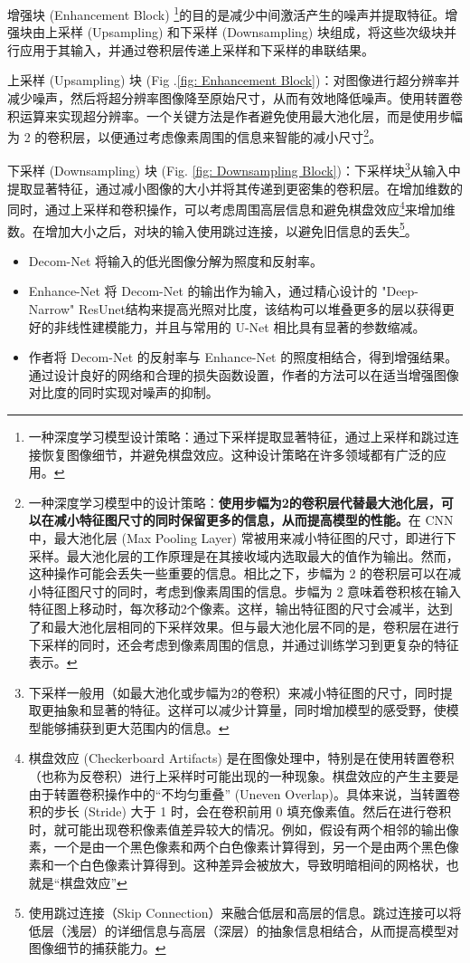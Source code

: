 \documentclass[letterpaper,10pt]{article}
\begin{document}
			增强块 (Enhancement Block) \footnote{一种深度学习模型设计策略：通过下采样提取显著特征，通过上采样和跳过连接恢复图像细节，并避免棋盘效应。这种设计策略在许多领域都有广泛的应用。}的目的是减少中间激活产生的噪声并提取特征。增强块由上采样 (Upsampling) 和下采样 (Downsampling) 块组成，将这些次级块并行应用于其输入，并通过卷积层传递上采样和下采样的串联结果。
			
			上采样 (Upsampling) 块 (Fig .\ref{fig: Enhancement Block})：对图像进行超分辨率并减少噪声，然后将超分辨率图像降至原始尺寸，从而有效地降低噪声。使用转置卷积运算来实现超分辨率。一个关键方法是作者避免使用最大池化层，而是使用步幅为 2 的卷积层，以便通过考虑像素周围的信息来智能的减小尺寸\footnote{一种深度学习模型中的设计策略：\textbf{使用步幅为2的卷积层代替最大池化层，可以在减小特征图尺寸的同时保留更多的信息，从而提高模型的性能。}在 CNN 中，最大池化层 (Max Pooling Layer) 常被用来减小特征图的尺寸，即进行下采样。最大池化层的工作原理是在其接收域内选取最大的值作为输出。然而，这种操作可能会丢失一些重要的信息。相比之下，步幅为 2 的卷积层可以在减小特征图尺寸的同时，考虑到像素周围的信息。步幅为 2 意味着卷积核在输入特征图上移动时，每次移动2个像素。这样，输出特征图的尺寸会减半，达到了和最大池化层相同的下采样效果。但与最大池化层不同的是，卷积层在进行下采样的同时，还会考虑到像素周围的信息，并通过训练学习到更复杂的特征表示。}。
			
			下采样 (Downsampling) 块 (Fig. \ref{fig: Downsampling Block})：下采样块\footnote{下采样一般用（如最大池化或步幅为2的卷积）来减小特征图的尺寸，同时提取更抽象和显著的特征。这样可以减少计算量，同时增加模型的感受野，使模型能够捕获到更大范围内的信息。}从输入中提取显著特征，通过减小图像的大小并将其传递到更密集的卷积层。在增加维数的同时，通过上采样和卷积操作，可以考虑周围高层信息和避免棋盘效应\footnote{棋盘效应 (Checkerboard Artifacts) 是在图像处理中，特别是在使用转置卷积（也称为反卷积）进行上采样时可能出现的一种现象。棋盘效应的产生主要是由于转置卷积操作中的“不均匀重叠” (Uneven Overlap)。具体来说，当转置卷积的步长 (Stride) 大于 1 时，会在卷积前用 0 填充像素值。然后在进行卷积时，就可能出现卷积像素值差异较大的情况。例如，假设有两个相邻的输出像素，一个是由一个黑色像素和两个白色像素计算得到，另一个是由两个黑色像素和一个白色像素计算得到。这种差异会被放大，导致明暗相间的网格状，也就是“棋盘效应”}来增加维数。在增加大小之后，对块的输入使用跳过连接，以避免旧信息的丢失\footnote{使用跳过连接（Skip Connection）来融合低层和高层的信息。跳过连接可以将低层（浅层）的详细信息与高层（深层）的抽象信息相结合，从而提高模型对图像细节的捕获能力。}。
			
			\begin{itemize}
				\item[(1)] 
				Decom-Net 将输入的低光图像分解为照度和反射率。
				
				\item[(2)]
				Enhance-Net 将 Decom-Net 的输出作为输入，通过精心设计的 "Deep-Narrow" ResUnet结构来提高光照对比度，该结构可以堆叠更多的层以获得更好的非线性建模能力，并且与常用的 U-Net 相比具有显著的参数缩减。
				
				\item[(3)]
				作者将 Decom-Net 的反射率与 Enhance-Net 的照度相结合，得到增强结果。通过设计良好的网络和合理的损失函数设置，作者的方法可以在适当增强图像对比度的同时实现对噪声的抑制。
			\end{itemize}	
			
\end{document}
